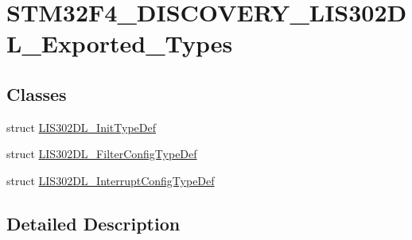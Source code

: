 \hypertarget{group___s_t_m32_f4___d_i_s_c_o_v_e_r_y___l_i_s302_d_l___exported___types}{\section{S\-T\-M32\-F4\-\_\-\-D\-I\-S\-C\-O\-V\-E\-R\-Y\-\_\-\-L\-I\-S302\-D\-L\-\_\-\-Exported\-\_\-\-Types}
\label{group___s_t_m32_f4___d_i_s_c_o_v_e_r_y___l_i_s302_d_l___exported___types}
}
\subsection*{Classes}
\begin{DoxyCompactItemize}
\item 
struct \hyperlink{struct_l_i_s302_d_l___init_type_def}{L\-I\-S302\-D\-L\-\_\-\-Init\-Type\-Def}
\item 
struct \hyperlink{struct_l_i_s302_d_l___filter_config_type_def}{L\-I\-S302\-D\-L\-\_\-\-Filter\-Config\-Type\-Def}
\item 
struct \hyperlink{struct_l_i_s302_d_l___interrupt_config_type_def}{L\-I\-S302\-D\-L\-\_\-\-Interrupt\-Config\-Type\-Def}
\end{DoxyCompactItemize}


\subsection{Detailed Description}
